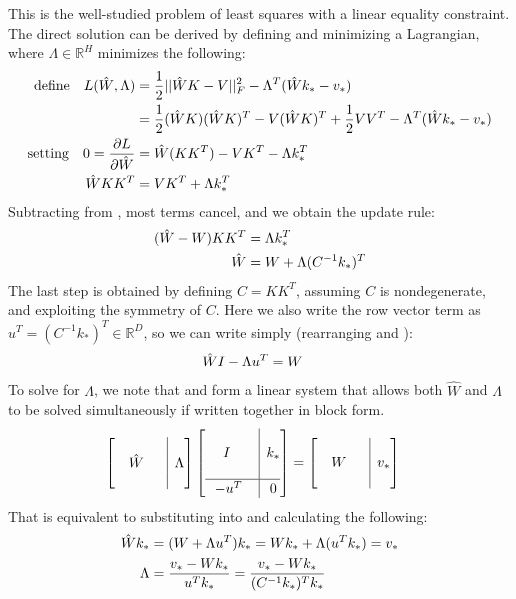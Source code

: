 This is the well-studied problem of least squares with a linear equality constraint.  The direct solution can be derived by defining and minimizing a Lagrangian, where $\Lambda \in \mathbb{R}^{H}$ minimizes the following:
\begin{align}
\text{define}\quad L(\hat{W}, \Lambda) &= \frac{1}{2} ||\hat{W}K-V||_F^2 - \Lambda^T(\hat{W}k_*-v_*) \\
&=\frac{1}{2} (\hat{W}K)(\hat{W}K)^T - V(\hat{W}K)^T + \frac{1}{2}VV^T - \Lambda^T(\hat{W}k_*-v_*) \\
\text{setting} \quad 0 = \frac{\partial L}{\partial \hat{W}} &= \hat{W}(KK^T) - VK^T -  \Lambda k_*^T\\
\hat{W}KK^T &= VK^T + \Lambda k_*^T
\lbleq{cls-normal-eq}
\end{align}
Subtracting  from , most terms cancel, and we obtain the update rule:
\begin{align}
    (\hat{W}-W) KK^T & = \Lambda k_*^T \\
    \hat{W} & = W + \Lambda (C^{-1}k_*)^T
    \lbleq{cls-soln}
\end{align}
The last step is obtained by defining $C = KK^T$, assuming $C$ is nondegenerate, and exploiting the symmetry of $C$.  Here we also write the row vector term as $u^T = (C^{-1}k_*)^T \in \mathbb{R}^{D}$, so we can write simply (rearranging  and ):
\begin{align}
\hat{W}I - \Lambda u^T &= W
\lbleq{rome2}
\end{align}
To solve for $\Lambda$, we note that  and   form a linear system that allows both $\hat{W}$ and $\Lambda$ to be solved simultaneously if written together in block form.
\begin{align}
\left[\begin{array}{@{}c|c@{}}
\\
\quad \hat{W} \quad\, & \Lambda \\
\,
\end{array}\right]
\left[\begin{array}{@{}c|c@{}}
\\
\quad\; I \quad\;\; & k_* \\
\\ \hline
-u^T \rule{0pt}{2.2ex} & 0
\end{array}\right]
& =
\left[\begin{array}{@{}c|c@{}}
\mathstrut \\
\quad W \quad\, & v_* \\
\mathstrut 
\end{array}\right]
\end{align}
That is equivalent to substituting  into  and calculating the following:
\begin{align}
    \hat{W} k_*
    & = (W + \Lambda u^T) k_*
    = W k_* + \Lambda (u^T k_*) = v_* \\
    \Lambda & = \frac{v_* - W k_*}{u^T k_*}
    = \frac{v_* - W k_*}{(C^{-1} k_*)^T k_*}
\lbleq{block-solution}
\end{align}
\clearpage
